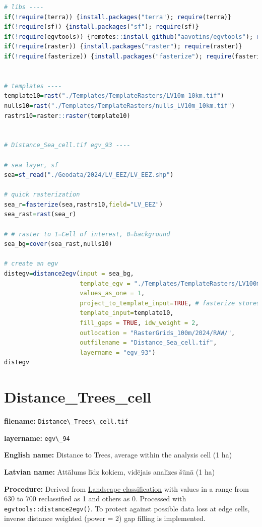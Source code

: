\documentclass[
]{book}
\newcommand{\passthrough}[1]{#1}
\begin{document}
\begin{lstlisting}[language=R]
# libs ----
if(!require(terra)) {install.packages("terra"); require(terra)}
if(!require(sf)) {install.packages("sf"); require(sf)}
if(!require(egvtools)) {remotes::install_github("aavotins/egvtools"); require(egvtools)}
if(!require(raster)) {install.packages("raster"); require(raster)}
if(!require(fasterize)) {install.packages("fasterize"); require(fasterize)}


# templates ----
template10=rast("./Templates/TemplateRasters/LV10m_10km.tif")
nulls10=rast("./Templates/TemplateRasters/nulls_LV10m_10km.tif")
rastrs10=raster::raster(template10)


# Distance_Sea_cell.tif egv_93 ----

# sea layer, sf
sea=st_read("./Geodata/2024/LV_EEZ/LV_EEZ.shp")

# quick rasterization
sea_r=fasterize(sea,rastrs10,field="LV_EEZ")
sea_rast=rast(sea_r)

# # raster to 1=Cell of interest, 0=background
sea_bg=cover(sea_rast,nulls10)

# create an egv
distegv=distance2egv(input = sea_bg,
                     template_egv = "./Templates/TemplateRasters/LV100m_10km.tif",
                     values_as_one = 1,
                     project_to_template_input=TRUE, # fasterize stores CRS differently
                     template_input=template10,
                     fill_gaps = TRUE, idw_weight = 2,
                     outlocation = "RasterGrids_100m/2024/RAW/",
                     outfilename = "Distance_Sea_cell.tif",
                     layername = "egv_93")
distegv
\end{lstlisting}

\section{Distance\_Trees\_cell}\label{ch06.094}

\textbf{filename:} \passthrough{\lstinline!Distance\_Trees\_cell.tif!}

\textbf{layername:} \passthrough{\lstinline!egv\_94!}

\textbf{English name:} Distance to Trees, average within the analysis cell (1 ha)

\textbf{Latvian name:} Attālums līdz kokiem, vidējais analīzes šūnā (1 ha)

\textbf{Procedure:} Derived from \hyperref[Ch05.03]{Landscape classification} with values in
a range from 630 to 700 reclassified as 1 and others as 0. Processed
with \passthrough{\lstinline!egvtools::distance2egv()!}. To protect against possible data loss at
edge cells, inverse distance
weighted (power = 2) gap filling is implemented.
\end{document}
